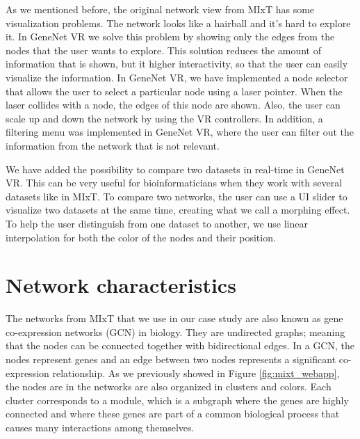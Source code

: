As we mentioned before, the original network view from MIxT has some visualization problems. The network looks like a hairball and it's hard to explore it. In GeneNet VR we solve this problem by showing only the edges from the nodes that the user wants to explore. This solution reduces the amount of information that is shown, but it higher interactivity, so that the user can easily visualize the information. In GeneNet VR, we have implemented a node selector that allows the user to select a particular node using a laser pointer. When the laser collides with a node, the edges of this node are shown. Also, the user can scale up and down the network by using the VR controllers. In addition, a filtering menu was implemented in GeneNet VR, where the user can filter out the information from the network that is not relevant.

We have added the possibility to compare two datasets in real-time in GeneNet VR. This can be very useful for bioinformaticians when they work with several datasets like in MIxT. To compare two networks, the user can use a UI slider to visualize two datasets at the same time, creating what we call a morphing effect. To help the user distinguish from one dataset to another, we use linear interpolation for both the color of the nodes and their position.

\section{Network characteristics}
The networks from MIxT that we use in our case study are also known as gene co-expression networks (GCN) in biology. They are undirected graphs; meaning that the nodes can be connected together with bidirectional edges. In a GCN, the nodes represent genes and an edge between two nodes represents a significant co-expression relationship. As we previously showed in Figure \ref{fig:mixt_webapp}, the nodes are in the networks are also organized in clusters and colors. Each cluster corresponds to a module, which is a subgraph where the genes are highly connected and where these genes are part of a common biological process that causes many interactions among themselves.
